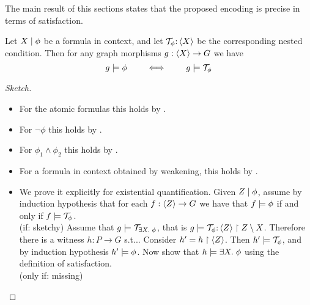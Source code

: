 The main result of this sections states that the proposed encoding is precise in terms of satisfaction. 
\begin{proposition}
	Let ${X} \mid {\phi}$ be a formula in context, and let ${\mathcal{T}}_\phi {:}\, \langle X\rangle$ be the corresponding nested condition. Then for any graph morphisms $g: \langle X\rangle \rightarrow G$ we have
	$$ g \models \phi \qquad \iff \qquad g \models {\mathcal{T}}_\phi $$
\end{proposition}
\begin{proof}[Sketch]
	\begin{itemize}
	\item For the atomic formulas this holds by .
	\item For $\neg \phi$ this holds by .
	
	\item For $\phi_1 \wedge \phi_2$ this holds by .
	\item For a formula in context obtained by weakening, this holds by .
	\item We prove it explicitly for existential quantification. Given ${Z} \mid {\phi}$, assume by induction hypothesis that for each $f: \langle Z\rangle \rightarrow G$ we have that  $f \models \phi$ if and only if $f \models {\mathcal{T}}_\phi$. \\
	(if: sketchy) Assume that  $g \models {\mathcal{T}}_{\exists X.\; \phi}$, that is $g \models {\mathcal{T}}_{\phi}{:}\,\langle Z\rangle \restriction Z\setminus X$. Therefore there is a witness $h: P \to G$ s.t... Consider $h' = h \restriction \langle Z\rangle$. Then $h' \models {\mathcal{T}}_\phi$, and by induction hypothesis $h' \models \phi$.
	Now show that $h \models \exists X.\; \phi$ using the definition of satisfaction.\\
	(only if: missing)
\end{itemize}


\end{proof}




